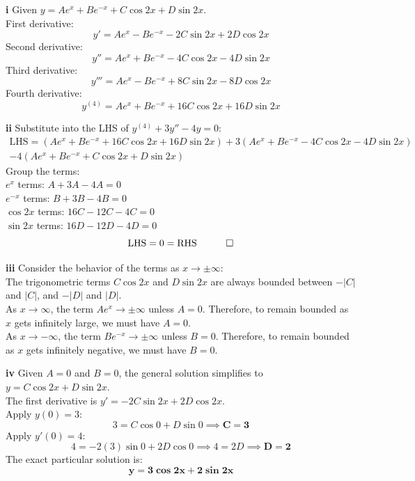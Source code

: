 \begin{solution}
\textbf{i} Given $y = Ae^x + Be^{-x} + C\cos 2x + D\sin 2x$. \\
First derivative:
\[ y' = Ae^x - Be^{-x} - 2C\sin 2x + 2D\cos 2x \]
Second derivative:
\[ y'' = Ae^x + Be^{-x} - 4C\cos 2x - 4D\sin 2x \]
Third derivative:
\[ y''' = Ae^x - Be^{-x} + 8C\sin 2x - 8D\cos 2x \]
Fourth derivative:
\[ y^{(4)} = Ae^x + Be^{-x} + 16C\cos 2x + 16D\sin 2x \]

\vspace{0.3cm}
\textbf{ii} Substitute into the LHS of $y^{(4)} + 3y'' - 4y = 0$:
\begin{multline*}
\text{LHS} = (Ae^x + Be^{-x} + 16C\cos 2x + 16D\sin 2x) + 3(Ae^x + Be^{-x} - 4C\cos 2x - 4D\sin 2x) \\
- 4(Ae^x + Be^{-x} + C\cos 2x + D\sin 2x)
\end{multline*}
Group the terms: \\
$e^x$ terms: $A + 3A - 4A = 0$ \\
$e^{-x}$ terms: $B + 3B - 4B = 0$ \\
$\cos 2x$ terms: $16C - 12C - 4C = 0$ \\
$\sin 2x$ terms: $16D - 12D - 4D = 0$
\[ \text{LHS} = 0 = \text{RHS} \quad \qed \]

\vspace{0.3cm}
\textbf{iii} Consider the behavior of the terms as $x \to \pm \infty$: \\
The trigonometric terms $C\cos 2x$ and $D\sin 2x$ are always bounded between $-|C|$ and $|C|$, and $-|D|$ and $|D|$. \\
As $x \to \infty$, the term $Ae^x \to \pm \infty$ unless $A = 0$. Therefore, to remain bounded as $x$ gets infinitely large, we must have \textbf{$A = 0$}. \\
As $x \to -\infty$, the term $Be^{-x} \to \pm \infty$ unless $B = 0$. Therefore, to remain bounded as $x$ gets infinitely negative, we must have \textbf{$B = 0$}.

\vspace{0.3cm}
\textbf{iv} Given $A = 0$ and $B = 0$, the general solution simplifies to $y = C\cos 2x + D\sin 2x$. \\
The first derivative is $y' = -2C\sin 2x + 2D\cos 2x$. \\
Apply $y(0) = 3$:
\[ 3 = C\cos 0 + D\sin 0 \implies \mathbf{C = 3} \]
Apply $y'(0) = 4$:
\[ 4 = -2(3)\sin 0 + 2D\cos 0 \implies 4 = 2D \implies \mathbf{D = 2} \]
The exact particular solution is:
\[ \mathbf{y = 3\cos 2x + 2\sin 2x} \]
\end{solution}

